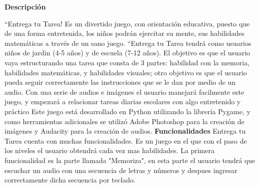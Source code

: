 \documentclass[12pt]{report}
\begin{document}
	\begingroup
		\large{
			\textbf{
				\newline
				\newline
				\newline
				\newline
				Descripción
				\newline
				\newline
			}
		}
	\endgroup

``Entrega tu Tarea! Es un divertido juego, con orientación educativa, puesto que de una forma entretenida, los niños podrán ejercitar su mente, sus habilidades matemáticas a través de un sano juego.
\newline
\newline
``Entrega tu Tarea tendrá como usuarios niños de jardin (4-5 años)  y de escuela (7-12 años). El objetivo es que el usuario vaya estructurando una tarea que consta de 3 partes: habilidad con la memoria, habilidades matemáticas, y habilidades visuales; otro objetivo es que el usuario pueda seguir correctamente las instrucciones que se le dan por medio de un audio.
\newline
\newline
Con una serie de audios e imágenes el usuario manejará facilmente este juego, y empezará a relacionar tareas diarias escolares con algo entretenido y práctico
\newline
\newline
Este juego está desarrollado en Python utilizando la librería Pygame, y como herramientas adicionales se utilizó Adobe Photoshop para la creación de imágenes y Audacity para la creación de audios.
	\newline
	\newline
	\newline
	\begingroup
		\large{
			\textbf{
				Funcionalidades
				\newline
				\newline
			}
		}
	\endgroup
\newline
Entrega tu Tarea cuenta con muchas funcionalidades. Es un juego en el que con el paso de los niveles el usuario obtendrá cada vez mas habilidades.
\newline
\newline
La primera funcionalidad es la parte llamada "Memoriza", en esta parte el usuario tendrá que escuchar un audio con una secuencia de letras y números y despues ingresar correctamente dicha secuencia por teclado.
\newline
\newline
\end{document}
